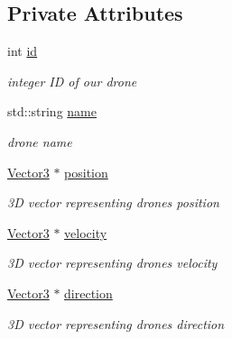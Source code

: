 \subsection*{Private Attributes}
\begin{DoxyCompactItemize}
\item 
\mbox{\label{classDrone_a5aa543be4e70c00b14a38fef06bf6166}} 
int \hyperlink{classDrone_a5aa543be4e70c00b14a38fef06bf6166}{id}
\begin{DoxyCompactList}\small\item\em integer ID of our drone \end{DoxyCompactList}\item 
\mbox{\label{classDrone_ac5f6c269378659247acd057142542013}} 
std\+::string \hyperlink{classDrone_ac5f6c269378659247acd057142542013}{name}
\begin{DoxyCompactList}\small\item\em drone name \end{DoxyCompactList}\item 
\mbox{\label{classDrone_ae9fe2ea1c0fc66f852efb674b66661f3}} 
\hyperlink{classVector3}{Vector3} $\ast$ \hyperlink{classDrone_ae9fe2ea1c0fc66f852efb674b66661f3}{position}
\begin{DoxyCompactList}\small\item\em 3D vector representing drone\textquotesingle{}s position \end{DoxyCompactList}\item 
\mbox{\label{classDrone_ac3a222e76594ec66819cbc5c45f4bcc6}} 
\hyperlink{classVector3}{Vector3} $\ast$ \hyperlink{classDrone_ac3a222e76594ec66819cbc5c45f4bcc6}{velocity}
\begin{DoxyCompactList}\small\item\em 3D vector representing drone\textquotesingle{}s velocity \end{DoxyCompactList}\item 
\mbox{\label{classDrone_a09d9eeafc319e4f900033ce9af4fee86}} 
\hyperlink{classVector3}{Vector3} $\ast$ \hyperlink{classDrone_a09d9eeafc319e4f900033ce9af4fee86}{direction}
\begin{DoxyCompactList}\small\item\em 3D vector representing drone\textquotesingle{}s direction \end{DoxyCompactList}\item 

\end{DoxyCompactItemize}

